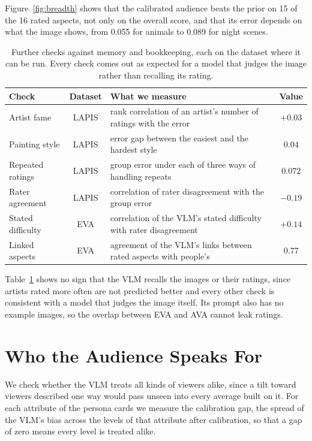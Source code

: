 \documentclass[runningheads]{llncs}
\begin{document}
Figure~\ref{fig:breadth} shows that the calibrated audience beats the prior on 15 of the 16 rated aspects, not only on the overall score, and that its error depends on what the image shows, from 0.055 for animals to 0.089 for night scenes.

\begin{table}[tbp]
  \caption{Further checks against memory and bookkeeping, each on the dataset where it can be run. Every check comes out as expected for a model that judges the image rather than recalling its rating.}
  \label{tab:robust}
  \centering
  \fontsize{7.5}{9}\selectfont
  \setlength{\aboverulesep}{0pt}\setlength{\belowrulesep}{0pt}
  \renewcommand{\arraystretch}{1.0}
  \begin{tabularx}{\linewidth}{l|c|>{\raggedright\arraybackslash}X|c}
    \toprule
    Check\tstrut\bstrut & Dataset & What we measure & Value \\
    \midrule
    Artist fame\tstrut & LAPIS & rank correlation of an artist's number of ratings with the error & $+0.03$ \\
    Painting style & LAPIS & error gap between the easiest and the hardest style & $0.04$ \\
    Repeated ratings & LAPIS & group error under each of three ways of handling repeats & $0.072$ \\
    Rater agreement & LAPIS & correlation of rater disagreement with the group error & $-0.19$ \\
    Stated difficulty & EVA & correlation of the VLM's stated difficulty with rater disagreement & $+0.14$ \\
    Linked aspects\bstrut & EVA & agreement of the VLM's links between rated aspects with people's & $0.77$ \\
    \bottomrule
  \end{tabularx}
\end{table}

Table~\ref{tab:robust} shows no sign that the VLM recalls the images or their ratings, since artists rated more often are not predicted better and every other check is consistent with a model that judges the image itself. Its prompt also has no example images, so the overlap between EVA and AVA cannot leak ratings.

\section{Who the Audience Speaks For}
\label{sup:fairness}
We check whether the VLM treats all kinds of viewers alike, since a tilt toward viewers described one way would pass unseen into every average built on it. For each attribute of the persona cards we measure the calibration gap, the spread of the VLM's bias across the levels of that attribute after calibration, so that a gap of zero means every level is treated alike.
\end{document}

